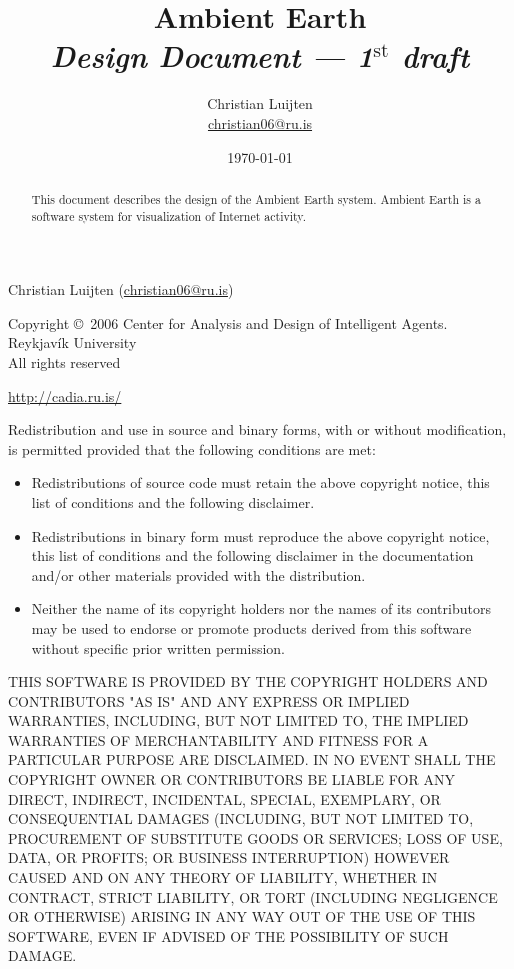\documentclass[english,a4paper,twoside]{scrreprt}
\title{Ambient Earth\\
       {\Large \emph{Design Document --- 1$^{\text{st}}$ draft\/}}}
\author{Christian Luijten\\\url{christian06@ru.is}}
\date{\today}
\begin{document}
\maketitle

\begin{abstract}
  This document describes the design of the Ambient Earth system. Ambient Earth
  is a software system for visualization of Internet activity.
\end{abstract}

\vfill

\begin{adjustwidth}{4em}{4em}
{\scriptsize
  Christian Luijten (\url{christian06@ru.is})

  Copyright \copyright\ 2006 Center for Analysis and Design of Intelligent
  Agents. \\
  Reykjavík University \\
  All rights reserved

  \url{http://cadia.ru.is/}

  Redistribution and use in source and binary forms, with or without
  modification, is permitted provided that the following conditions are met:

  \begin{itemize}
    \item Redistributions of source code must retain the above copyright
      notice, this list of conditions and the following disclaimer.

    \item Redistributions in binary form must reproduce the above copyright
      notice, this list of conditions and the following disclaimer in the
      documentation and/or other materials provided with the distribution.

    \item Neither the name of its copyright holders nor the names of its
      contributors may be used to endorse or promote products derived from this
      software without specific prior written permission.

  \end{itemize}

  THIS SOFTWARE IS PROVIDED BY THE COPYRIGHT HOLDERS AND CONTRIBUTORS "AS IS"
  AND ANY EXPRESS OR IMPLIED WARRANTIES, INCLUDING, BUT NOT LIMITED TO, THE
  IMPLIED WARRANTIES OF MERCHANTABILITY AND FITNESS FOR A PARTICULAR PURPOSE
  ARE DISCLAIMED. IN NO EVENT SHALL THE COPYRIGHT OWNER OR CONTRIBUTORS BE
  LIABLE FOR ANY DIRECT, INDIRECT, INCIDENTAL, SPECIAL, EXEMPLARY, OR
  CONSEQUENTIAL DAMAGES (INCLUDING, BUT NOT LIMITED TO, PROCUREMENT OF
  SUBSTITUTE GOODS OR SERVICES; LOSS OF USE, DATA, OR PROFITS; OR BUSINESS
  INTERRUPTION) HOWEVER CAUSED AND ON ANY THEORY OF LIABILITY, WHETHER IN
  CONTRACT, STRICT LIABILITY, OR TORT (INCLUDING NEGLIGENCE OR OTHERWISE)
  ARISING IN ANY WAY OUT OF THE USE OF THIS SOFTWARE, EVEN IF ADVISED OF THE
  POSSIBILITY OF SUCH DAMAGE.

}
\end{adjustwidth}
\end{document}
